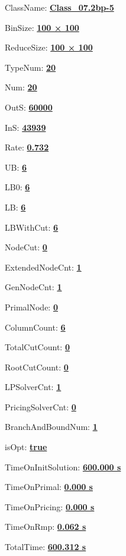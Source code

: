 \documentclass[11pt]{article}
\begin{document}
\pagestyle{empty}


ClassName: \underline{\textbf{Class_07.2bp-5}}
\par
BinSize: \underline{\textbf{100 × 100}}
\par
ReduceSize: \underline{\textbf{100 × 100}}
\par
TypeNum: \underline{\textbf{20}}
\par
Num: \underline{\textbf{20}}
\par
OutS: \underline{\textbf{60000}}
\par
InS: \underline{\textbf{43939}}
\par
Rate: \underline{\textbf{0.732}}
\par
UB: \underline{\textbf{6}}
\par
LB0: \underline{\textbf{6}}
\par
LB: \underline{\textbf{6}}
\par
LBWithCut: \underline{\textbf{6}}
\par
NodeCut: \underline{\textbf{0}}
\par
ExtendedNodeCnt: \underline{\textbf{1}}
\par
GenNodeCnt: \underline{\textbf{1}}
\par
PrimalNode: \underline{\textbf{0}}
\par
ColumnCount: \underline{\textbf{6}}
\par
TotalCutCount: \underline{\textbf{0}}
\par
RootCutCount: \underline{\textbf{0}}
\par
LPSolverCnt: \underline{\textbf{1}}
\par
PricingSolverCnt: \underline{\textbf{0}}
\par
BranchAndBoundNum: \underline{\textbf{1}}
\par
isOpt: \underline{\textbf{true}}
\par
TimeOnInitSolution: \underline{\textbf{600.000 s}}
\par
TimeOnPrimal: \underline{\textbf{0.000 s}}
\par
TimeOnPricing: \underline{\textbf{0.000 s}}
\par
TimeOnRmp: \underline{\textbf{0.062 s}}
\par
TotalTime: \underline{\textbf{600.312 s}}
\par
\newpage


\end{document}
